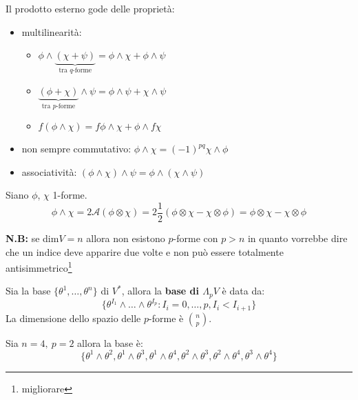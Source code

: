 Il prodotto esterno gode delle proprietà:
\begin{itemize}
    \item multilinearità:
    \begin{itemize}
    \item $\phi \wedge \underbrace{( \chi + \psi)}_ \text{tra $q$-forme} = \phi \wedge \chi + \phi \wedge \psi$
    \item $\underbrace{(\phi + \chi )}_\text{tra $p$-forme} \wedge \psi = \phi \wedge \psi + \chi \wedge \psi$
    \item $f(\phi \wedge \chi)=f \phi \wedge \chi+ \phi \wedge f\chi$
    \end{itemize}
   
    \item non sempre commutativo: $\phi \wedge \chi = (-1)^{pq}\chi \wedge \phi $
    
    \item associatività: $(\phi \wedge \chi)\wedge \psi = \phi \wedge ( \chi \wedge \psi)$
\end{itemize}
\begin{esempio}
Siano $\phi$, $\chi$ 1-forme.
\begin{equation*}
    \phi \wedge \chi = 2 \mathcal{A}(\phi \otimes \chi) = 2\frac{1}{2}(\phi \otimes \chi - \chi \otimes \phi) = \phi \otimes \chi - \chi \otimes \phi
\end{equation*}
\end{esempio}
\textbf{N.B:} se dim$V=n$ allora non esistono $p$-forme con $p>n$ in quanto vorrebbe dire che un indice deve apparire due volte e non può essere totalmente antisimmetrico\footnote{migliorare}

Sia la base $\{ \theta^1, \dots, \theta^n\}$ di $V^*$, allora la \textbf{base di $\Lambda_p V$} è data da:
\begin{equation*}
    \{ \theta^{I_1} \wedge \dots \wedge \theta^{I_p} : I_i= 0, \dots, p, I_i < I_{i+1} \}
\end{equation*}
La dimensione dello spazio delle $p$-forme è $\binom{n}{p}$.
\begin{esempio}
Sia $n=4, \ p=2$ allora la base è:
\begin{equation*}
    \{ \theta^1 \wedge \theta^2, \theta^1 \wedge \theta^3, \theta^1 \wedge \theta^4, \theta^2 \wedge \theta^3, \theta^2 \wedge \theta^4, \theta^3 \wedge \theta^4 \}
\end{equation*}
\end{esempio}


